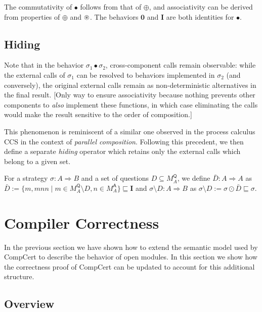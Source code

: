 \documentclass[acmsmall,timestamp,review,anonymous]{acmart}
\newcommand{\kw}[1]{\ensuremath{ \mathsf{#1} }}
\begin{document}
The commutativity of $\bullet$ follows from that of $\oplus$,
and associativity can be derived from properties of $\oplus$ and $\oast$.
The behaviors $\mathbf{0}$ and $\mathbf{I}$
are both identities for $\bullet$.


\subsection{Hiding} %

Note that
in the behavior $\sigma_1 \bullet \sigma_2$,
cross-component calls remain observable:
while the external calls of $\sigma_1$
can be resolved to behaviors implemented in $\sigma_2$
(and conversely),
the original external calls remain
as non-deterministic alternatives in the final result.
[Only way to ensure associativity
because nothing prevents other components
to \emph{also} implement these functions,
in which case eliminating the calls
would make the result sensitive to the order of composition.]

This phenomenon is reminiscent of a similar one observed
in the process calculus CCS \cite{ccs}
in the context of \emph{parallel composition}.
Following this precedent,
we then define a separate \emph{hiding} operator
which retains only the external calls
which belong to a given set.

\begin{definition}[Hiding]
For a strategy $\sigma : A \Rightarrow B$ and
a set of questions $D \subseteq M_A^\kw{Q}$,
we define $\bar{D} : A \Rightarrow A$ as
$\bar{D} := \{ m, mnn \mid m \in M_A^\kw{Q} \setminus D, n \in M_A^\kw{A} \}
\sqsubseteq \mathbf{I}$
and $\sigma \setminus D : A \Rightarrow B$ as
$\sigma \setminus D := \sigma \odot \bar{D} \sqsubseteq \sigma$.
\end{definition}



\section{Compiler Correctness} \label{sec:compcert} %

In the previous section
we have shown how to extend
the semantic model used by CompCert
to describe the behavior of open modules.
In this section
we show how the correctness proof of CompCert
can be updated to account for this additional structure.

\subsection{Overview} \label{sec:compcert:overview} %
\end{document}
